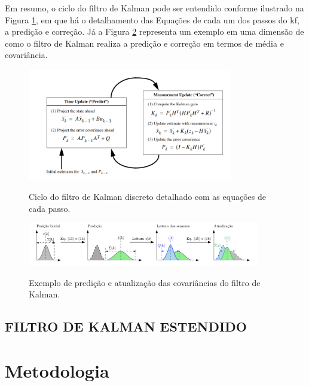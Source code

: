 \documentclass[acronym, symbols]{fei}
\begin{document}
				Em resumo, o ciclo do filtro de Kalman pode ser entendido conforme ilustrado na Figura \ref{fig:ciclo_filtro_de_kalman_equacoes}, em que há o detalhamento das Equações de cada um dos passos do \acrshort{kf}, a predição e correção. Já a Figura \ref{fig:exemplo_filtro_de_kalman_covariancias} representa um exemplo em uma dimensão de como o filtro de Kalman realiza a predição e correção em termos de média e covariância.
				
				\begin{figure}[!htb]
					\centering
					\caption{Ciclo do filtro de Kalman discreto detalhado com as equações de cada passo.} 
					\includegraphics[width=0.8\textwidth]{ciclo_filtro_de_kalman_equacoes.png}
					\label{fig:ciclo_filtro_de_kalman_equacoes}
				\end{figure}
			
				\begin{figure}[!htb]
					\centering
					\caption{Exemplo de predição e atualização das covariâncias do filtro de Kalman.}
					\includegraphics[width=0.9\textwidth]{exemplo_filtro_de_kalman.png}
					\label{fig:exemplo_filtro_de_kalman_covariancias}
				\end{figure}
		
		\section{FILTRO DE KALMAN ESTENDIDO}
			
\chapter{Metodologia}
\end{document}
